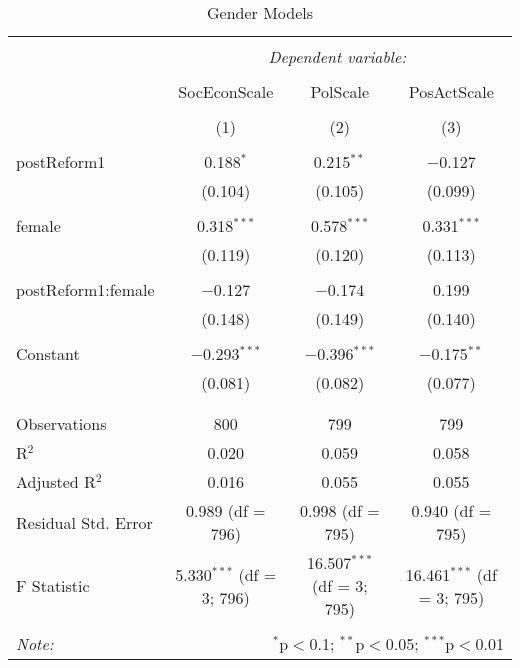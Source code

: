 
\begin{table}[!htbp] \centering 
  \caption{Gender Models} 
  \label{} 
\begin{tabular}{@{\extracolsep{5pt}}lccc} 
\\[-1.8ex]\hline 
\hline \\[-1.8ex] 
 & \multicolumn{3}{c}{\textit{Dependent variable:}} \\ 
\cline{2-4} 
\\[-1.8ex] & SocEconScale & PolScale & PosActScale \\ 
\\[-1.8ex] & (1) & (2) & (3)\\ 
\hline \\[-1.8ex] 
 postReform1 & 0.188$^{*}$ & 0.215$^{**}$ & $-$0.127 \\ 
  & (0.104) & (0.105) & (0.099) \\ 
  & & & \\ 
 female & 0.318$^{***}$ & 0.578$^{***}$ & 0.331$^{***}$ \\ 
  & (0.119) & (0.120) & (0.113) \\ 
  & & & \\ 
 postReform1:female & $-$0.127 & $-$0.174 & 0.199 \\ 
  & (0.148) & (0.149) & (0.140) \\ 
  & & & \\ 
 Constant & $-$0.293$^{***}$ & $-$0.396$^{***}$ & $-$0.175$^{**}$ \\ 
  & (0.081) & (0.082) & (0.077) \\ 
  & & & \\ 
\hline \\[-1.8ex] 
Observations & 800 & 799 & 799 \\ 
R$^{2}$ & 0.020 & 0.059 & 0.058 \\ 
Adjusted R$^{2}$ & 0.016 & 0.055 & 0.055 \\ 
Residual Std. Error & 0.989 (df = 796) & 0.998 (df = 795) & 0.940 (df = 795) \\ 
F Statistic & 5.330$^{***}$ (df = 3; 796) & 16.507$^{***}$ (df = 3; 795) & 16.461$^{***}$ (df = 3; 795) \\ 
\hline 
\hline \\[-1.8ex] 
\textit{Note:}  & \multicolumn{3}{r}{$^{*}$p$<$0.1; $^{**}$p$<$0.05; $^{***}$p$<$0.01} \\ 
\end{tabular} 
\end{table} 
